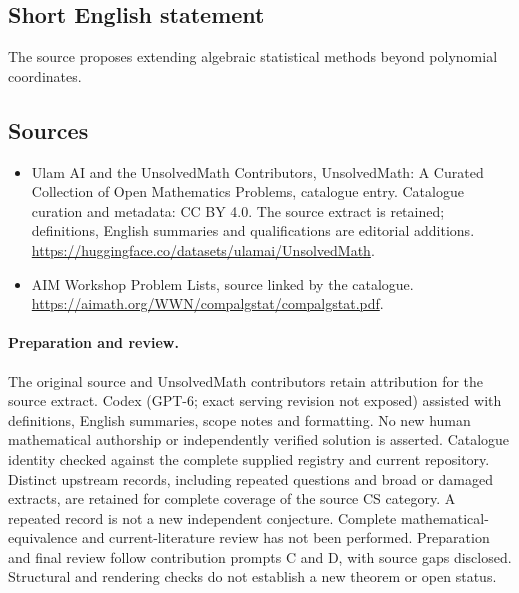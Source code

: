\documentclass[11pt]{article}
\begin{document}
\subsection{Short English statement}
The source proposes extending algebraic statistical methods beyond polynomial coordinates.
\subsection{Sources}
\begin{itemize}
\item[\hypertarget{source:statement:1}{S1}] Ulam AI and the UnsolvedMath Contributors, UnsolvedMath: A Curated Collection of Open Mathematics Problems, catalogue entry. Catalogue curation and metadata: CC BY 4.0. The source extract is retained; definitions, English summaries and qualifications are editorial additions.
\url{https://huggingface.co/datasets/ulamai/UnsolvedMath}.
\item[\hypertarget{source:statement:2}{S2}] AIM Workshop Problem Lists, source linked by the catalogue.
\url{https://aimath.org/WWN/compalgstat/compalgstat.pdf}.
\end{itemize}
\paragraph{Preparation and review.}
The original source and UnsolvedMath contributors retain attribution for the source extract. Codex (GPT-6; exact serving revision not exposed) assisted with definitions, English summaries, scope notes and formatting. No new human mathematical authorship or independently verified solution is asserted. Catalogue identity checked against the complete supplied registry and current repository. Distinct upstream records, including repeated questions and broad or damaged extracts, are retained for complete coverage of the source CS category. A repeated record is not a new independent conjecture. Complete mathematical-equivalence and current-literature review has not been performed. Preparation and final review follow contribution prompts C and D, with source gaps disclosed. Structural and rendering checks do not establish a new theorem or open status.
\label{end:statement}
\end{document}
